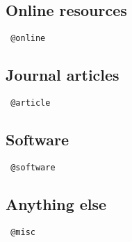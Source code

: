 \documentclass{article}
\begin{document}
\subsection{Online resources}
\begin{verbatim}
 @online
\end{verbatim}

\subsection{Journal articles}
\begin{verbatim}
 @article
\end{verbatim}

\subsection{Software}
\begin{verbatim}
 @software
\end{verbatim}

\subsection{Anything else}
\begin{verbatim}
 @misc
\end{verbatim}

\printbibliography

\vfil\eject
\end{document}
